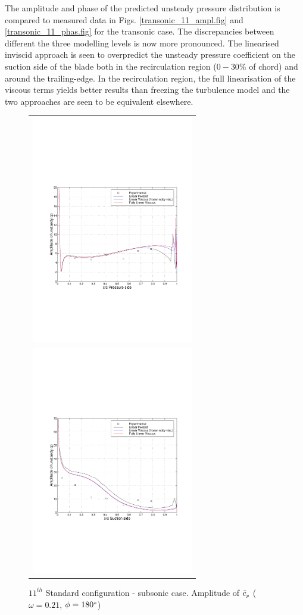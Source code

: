  The amplitude and phase of the predicted unsteady
 pressure distribution is compared to measured data
 in Figs. \ref{transonic_11_ampl.fig} and \ref{transonic_11_phas.fig}
 for the transonic case.
 The discrepancies between different the three modelling levels is now more pronounced.
 The linearised inviscid approach is seen to overpredict the unsteady
 pressure coefficient on the suction side of the blade both in the recirculation
 region ($0 - 30\%$ of chord) and around the trailing-edge.  In the recirculation region,
 the full linearisation of the viscous terms yields better results than freezing
 the turbulence model and the two approaches are seen to be equivalent elsewhere.
%
%
\begin{figure}
 \begin{center}
  \begin{tabular}{c}
    {\includegraphics[height=100mm,clip=t]{CHAP_LINEAR/FIGURE/unsteady_blade_069_180_1.pdf}}\\
    {\includegraphics[height=100mm,clip=t]{CHAP_LINEAR/FIGURE/unsteady_blade_069_180_2.pdf}}
  \end{tabular}
 \end{center}
 \vspace{-7mm}
 \caption{$11^{th}$ Standard configuration - subsonic case.
          Amplitude of $\tilde{c}_{\mbox{\tiny $p$}}$
         ($\omega = 0.21$, $\phi = 180^{\mbox{\tiny $o$}}$)}
 \label{subsonic_11_ampl.fig}
\end{figure}
